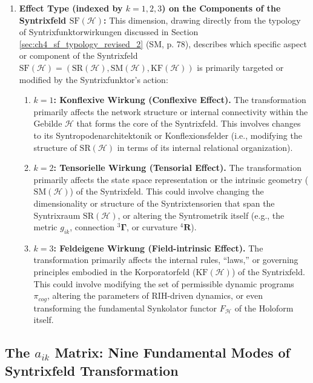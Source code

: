 \documentclass[
    12pt,              %
    a4paper,           %
    headings=normal,   %
    twoside=true,      %
    BCOR=8mm,          %
]{scrbook}
\newcommand{\q}[1]{\enquote{#1}}
\begin{document}
\begin{enumerate}[label=(\alph*)]
    \item  \textbf{Effect Type (indexed by \(k=1,2,3\)) on the Components of the Syntrixfeld \(\text{SF}(\mathcal{H})\):}
        This dimension, drawing directly from the typology of Syntrixfunktorwirkungen discussed in Section \ref{sec:ch4_sf_typology_revised_2} (SM, p. 78), describes which specific aspect or component of the Syntrixfeld \(\text{SF}(\mathcal{H}) = (\text{SR}(\mathcal{H}), \text{SM}(\mathcal{H}), \text{KF}(\mathcal{H}))\) is primarily targeted or modified by the Syntrixfunktor’s action:
        \begin{enumerate}[label=\roman*.]
            \item   \textbf{\(k=1\): Konflexive Wirkung (Conflexive Effect).} The transformation primarily affects the network structure or internal connectivity within the Gebilde \(\mathcal{H}\) that forms the core of the Syntrixfeld. This involves changes to its Syntropodenarchitektonik or Konflexionsfelder (i.e., modifying the structure of \(\text{SR}(\mathcal{H})\) in terms of its internal relational organization).
            \item   \textbf{\(k=2\): Tensorielle Wirkung (Tensorial Effect).} The transformation primarily affects the state space representation or the intrinsic geometry (\(\text{SM}(\mathcal{H})\)) of the Syntrixfeld. This could involve changing the dimensionality or structure of the Syntrixtensorien that span the Syntrixraum \(\text{SR}(\mathcal{H})\), or altering the Syntrometrik itself (e.g., the metric \(g_{ik}\), connection \({}^3\bm{\Gamma}\), or curvature \({}^4\mathbf{R}\)).
            \item   \textbf{\(k=3\): Feldeigene Wirkung (Field-intrinsic Effect).} The transformation primarily affects the internal rules, \q{laws,} or governing principles embodied in the Korporatorfeld (\(\text{KF}(\mathcal{H})\)) of the Syntrixfeld. This could involve modifying the set of permissible dynamic programs \(\pi_{cog}\), altering the parameters of RIH-driven dynamics, or even transforming the fundamental Synkolator functor \(F_\mathcal{H}\) of the Holoform itself.
        \end{enumerate}
\end{enumerate}

\subsection{The \(a_{ik}\) Matrix: Nine Fundamental Modes of Syntrixfeld Transformation}
\label{sec:ch4_aik_matrix_transformations_revised}
\end{document}
